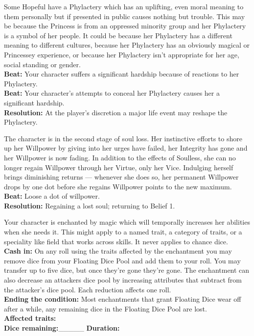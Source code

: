 \documentclass[10pt, frontgrid, backgrid]{flacards}
\begin{document}
{Some Hopeful have a Phylactery which has an uplifting, even moral meaning to them personally but if presented in public causes nothing but trouble. This may be because the Princess is from an oppressed minority group and her Phylactery is a symbol of her people. It could be because her Phylactery has a different meaning to different cultures, because her Phylactery has an obviously magical or Princessey experience, or because her Phylactery isn't appropriate for her age, social standing or gender.\\ 
\textbf{Beat:} Your character suffers a significant hardship because of reactions to her Phylactery.\\
\textbf{Beat:} Your character's attempts to conceal her Phylactery causes her a significant hardship.\\
\textbf{Resolution:} At the player's discretion a major life event may reshape the Phylactery. 
}

{The character is in the second stage of soul loss. Her instinctive efforts to shore up her Willpower by giving into her urges have failed, her Integrity has gone and her Willpower is now fading. In addition to the effects of Soulless, she can no longer regain Willpower through her Virtue, only her Vice. Indulging herself brings diminishing returns — whenever she does so, her permanent Willpower drops by one dot before she regains Willpower points to the new maximum.\\ 
\textbf{Beat:} Loose a dot of willpower.\\
\textbf{Resolution:} Regaining a lost soul; returning to Belief 1. 
}

{Your character is enchanted by magic which will temporally increases her abilities when she needs it. This might apply to a named trait, a category of traits, or a speciality like field that works across skills. It never applies to chance dice.\\
\textbf{Cash in:} On any roll using the traits affected by the enchantment you may remove dice from your Floating Dice Pool and add them to your roll. You may transfer up to five dice, but once they're gone they're gone.
The enchantment can also decrease an attackers dice pool by increasing attributes that subtract from the attacker's dice pool. Each reduction affects one roll.  \\
\textbf{Ending the condition:} Most enchantments that grant Floating Dice wear off after a while, any remaining dice in the Floating Dice Pool are lost.\\
\textbf{Affected traits:}\fillunderline\\
\textbf{Dice remaining:}\_\_\_\_\_ \textbf{Duration:}\fillunderline}
\end{document}
